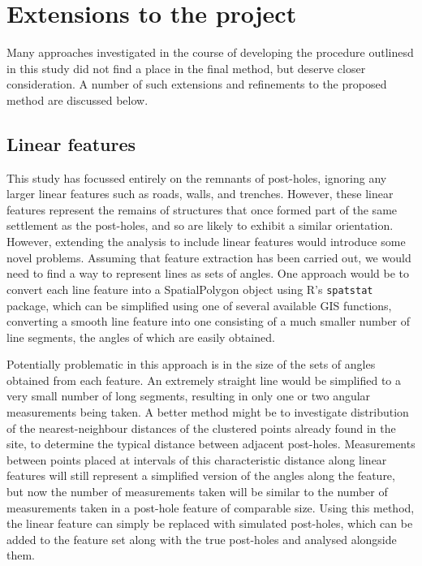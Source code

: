 \documentclass[../../ArchStats.tex]{subfiles}
\begin{document}
\section{Extensions to the project}

Many approaches investigated in the course of developing the procedure outlinesd in this study did not find a place in the final method, but deserve closer consideration. A number of such extensions and refinements to the proposed method are discussed below.

\subsection{Linear features}
This study has focussed entirely on the remnants of post-holes, ignoring any larger linear features such as roads, walls, and trenches. However, these linear features represent the remains of structures that once formed part of the same  settlement as the post-holes, and so are likely to exhibit a similar orientation. However, extending the analysis to include linear features would introduce some novel problems. Assuming that feature extraction has been carried out, we would need to find a way to represent lines as sets of angles. One approach would be to convert each line feature into a SpatialPolygon object using R's \texttt{spatstat} package, which can be simplified using one of several available GIS functions, converting a smooth line feature into one consisting of a much smaller number of line segments, the angles of which are easily obtained.

Potentially problematic in this approach is in the size of the sets of angles obtained from each feature. An extremely straight line would be simplified to a very small number of long segments, resulting in only one or two angular measurements being taken. A better method might be to investigate distribution of the nearest-neighbour distances of the clustered points already found in the site, to determine the typical distance between adjacent post-holes. Measurements between points placed at intervals of this characteristic distance along linear features will still represent a simplified version of the angles along the  feature, but now the number of measurements taken will be similar to the number of measurements taken in a post-hole feature of comparable size. Using this method, the linear feature can simply be replaced with simulated post-holes, which can be added to the feature set along with the true post-holes and analysed alongside them. 
\end{document}
